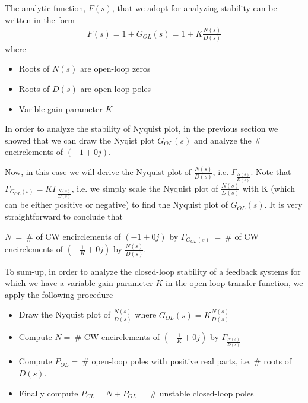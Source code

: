 \documentclass[twoside]{article}
\begin{document}
The analytic function, $F(s)$, that we adopt for analyzing stability 
can be written in the form  
%
\begin{align*}
  F(s) = 1 + G_{OL}(s) = 1 + K \frac{ N(s) }{ D(s) } 
\end{align*}
%
where 
\begin{itemize}
  \item Roots of $N(s)$ are open-loop zeros
  \item Roots of $D(s)$ are open-loop poles
  \item Varible gain parameter $K$
\end{itemize}
%
In order to analyze the stability of Nyquist plot,
in the previous section we showed that 
we can draw the Nyqist plot $G_{OL}(s)$
and analyze the $\#$ encirclements of $(-1 + 0 j)$.

Now, in this case we will derive the Nyquist plot of 
$\frac{N(s)}{D(s)}$, i.e. $\Gamma_{\frac{N(s)}{D(s)}}$. 
Note that $\Gamma_{G_{OL}(s)} = K \Gamma_{\frac{N(s)}{D(s)}}$,
i.e. we simply scale the Nyquist plot of $\frac{N(s)}{D(s)}$
with K (which can be either positive or negative) to find the
Nyquist plot of $G_{OL}(s)$. It is very straightforward to
conclude that 

\vspace{6 pt}

$N \ = \ \#$ of CW encirclements of $(-1 + 0 j)$ by  $\Gamma_{G_{OL}(s)} \
= \ \#$ of CW encirclements of $\left( -\frac{1}{K} + 0 j \right)$ by  $\frac{N(s)}{D(s)}$.

\vspace{6 pt}

To sum-up, in order to analyze the closed-loop stability of a 
feedback systems for which we have a variable gain parameter $K$ in
the open-loop transfer function, we apply the following 
procedure 

\begin{itemize}
 \item Draw the Nyquist plot of $\frac{N(s)}{D(s)}$ where $G_{OL}(s) =
   K \frac{N(s)}{D(s)}$
 \item Compute $N = \ \#$ CW encirclements of $\left( -\frac{1}{K}  + 0 j \right)$ by
   $\Gamma_{ \frac{N(s)}{D(s)} }$ 
 \item Compute $P_{OL} = \ \#$ open-loop poles with
   positive real parts, i.e. $\#$ roots of $D(s)$.
 \item Finally compute $P_{CL} = N +  P_{OL} = \ \#$
   unstable closed-loop poles  
\end{itemize}
\end{document}
